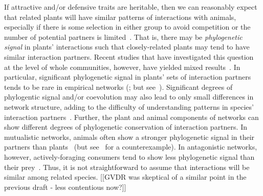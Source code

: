 \documentclass[12pt]{article}
\begin{document}
\begin{spacing}{1.5}
  If attractive and/or defensive traits are heritable,
  then we can reasonably expect that related plants will have similar 
  patterns of interactions with animals, especially if there is some selection in either group to avoid competition or the number of potential partners is limited~\citep{Schemske1999,Ponisio2017}. That is, there may be \emph{phylogenetic signal} in plants' interactions such that closely-related plants may tend to have similar interaction partners.
  Recent studies that have investigated this question at the level of whole
  communities, however, have yielded mixed results~\citep{Rezende2007a,Gomez2010,Rohr2014a,Fontaine2015,Lind2015,Ibanez2016,Bergamini2017,Sydenham2017,Volf2017,Hutchinson2017}.
  In particular, significant phylogenetic signal in plants' sets of interaction partners tends to be rare in empirical networks (\citealp{Rezende2007a,Lind2015,Ibanez2016}; but see~\citealp{Elias2013,Fontaine2015,Hutchinson2017}). Significant degrees of phylogentic signal and/or coevolution may also lead to only small differences in network structure, adding to the difficulty of understanding patterns in species' interaction partners~\citep{Ponisio2017}.
  Further, the plant and animal components of networks can show different degrees of phylogenetic conservation of interaction partners. In mutualistic networks, animals often show a stronger phylogenetic signal in their partners than plants~\citep{Rezende2007a,Chamberlain2014,Rohr2014,Vamosi2014,Lind2015,Fontaine2015} (but see~\citep{Rafferty2013} for a counterexample). In antagonistic networks, however, actively-foraging consumers tend to show less phylogenetic signal than their prey~\citep{Ives2006,Cagnolo2011,Naisbit2011,Fontaine2015}. Thus, it is not straightforward to assume that interactions will be similar among related species. [[GVDR was skeptical of a similar point in the previous draft - less contentious now?]]



\end{spacing}
\end{document}
